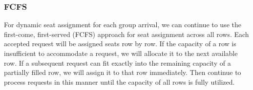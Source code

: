 
\subsubsection{FCFS}\label{largest_pattern}
For dynamic seat assignment for each group arrival, we can continue to use the first-come, first-served (FCFS) approach for seat assignment across all rows. Each accepted request will be assigned seats row by row. If the capacity of a row is insufficient to accommodate a request, we will allocate it to the next available row. If a subsequent request can fit exactly into the remaining capacity of a partially filled row, we will assign it to that row immediately. Then continue to process requests in this manner until the capacity of all rows is fully utilized.






